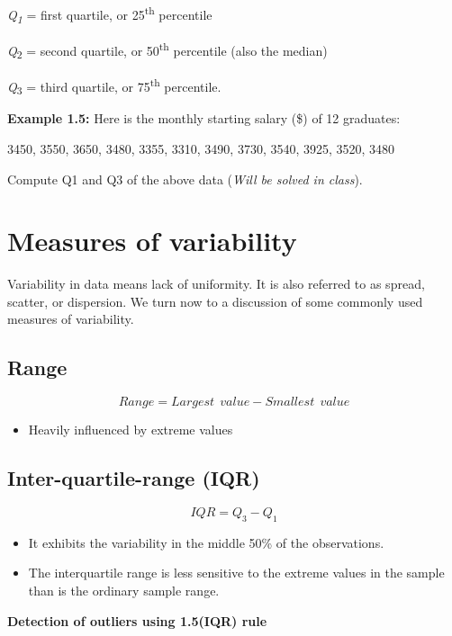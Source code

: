 \documentclass[
  11pt,
  letterpaper,
  DIV=11,
  numbers=noendperiod]{scrreprt}
\providecommand{\tightlist}{%
  \setlength{\itemsep}{0pt}\setlength{\parskip}{0pt}}
\begin{document}
\emph{Q\textsubscript{1}} = first quartile, or 25\textsuperscript{th}
percentile

\emph{Q}\textsubscript{2} = second quartile, or 50\textsuperscript{th}
percentile (also the median)

\emph{Q}\textsubscript{3} = third quartile, or 75\textsuperscript{th}
percentile.

\textbf{Example 1.5:} Here is the monthly starting salary (\$) of 12
graduates:

3450, 3550, 3650, 3480, 3355, 3310, 3490, 3730, 3540, 3925, 3520, 3480

Compute Q1 and Q3 of the above data (\emph{Will be solved in class}).

\section{Measures of variability}\label{measures-of-variability}

Variability in data means lack of uniformity. It is also referred to as
spread, scatter, or dispersion. We turn now to a discussion of some
commonly used measures of variability.

\subsection{Range}\label{range}

\[Range=Largest \ \ value-Smallest \ \ value \]

\begin{itemize}
\tightlist
\item
  Heavily influenced by extreme values
\end{itemize}

\subsection{Inter-quartile-range (IQR)}\label{inter-quartile-range-iqr}

\[IQR=Q_3-Q_1\]

\begin{itemize}
\item
  It exhibits the variability in the middle 50\% of the observations.
\item
  The interquartile range is less sensitive to the extreme values in the
  sample than is the ordinary sample range.
\end{itemize}

\textbf{Detection of outliers using 1.5(IQR) rule}
\end{document}
